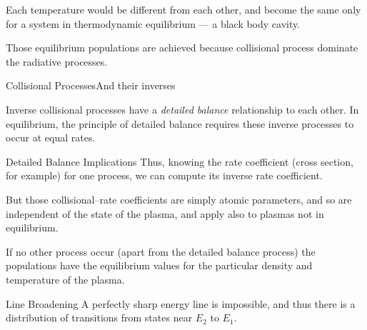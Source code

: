 \documentclass[final]{beamer}
\begin{document}
\begin{frame}{\lte}
  \begin{center}
\end{center}
Each temperature would be different from each other, and become the same only for a system in thermodynamic equilibrium --- a black body cavity.

Those equilibrium populations are achieved because collisional process dominate the radiative processes.
\end{frame}
\begin{frame}{Collisional Processes}{And their inverses}
  \begin{center}
\end{center}
Inverse collisional processes have a \emph{detailed balance} relationship to each other.
In equilibrium, the principle of detailed balance requires these inverse processes to occur at equal rates.

\end{frame}
\begin{frame}{Detailed Balance Implications}
Thus, knowing the rate coefficient (cross section, for example) for one process, we can compute its inverse rate coefficient.

But those collisional--rate coefficients are simply atomic parameters\footnotemark, and so are independent of the state of the plasma, and apply also to plasmas not in equilibrium.

If no other process occur (apart from the detailed balance process) the populations have the equilibrium values for the particular density and temperature of the plasma.
\end{frame}
\begin{frame}{Line Broadening}
A perfectly sharp energy line is impossible, and thus there is a distribution of transitions from states near $E_2$ to $E_1$.
\end{frame}
\end{document}
